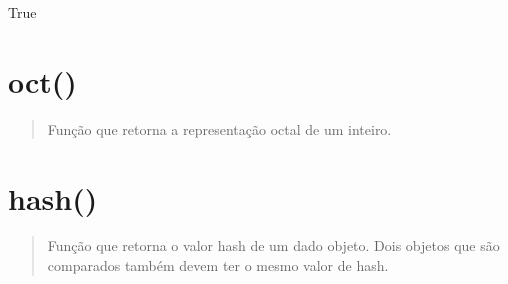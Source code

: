 \documentclass[letterpaper,10pt,brazil]{sphinxmanual}
\begin{document}
True


\section{oct()}
\label{\detokenize{content/built-ins:oct}}\begin{quote}

Função que retorna a representação octal de um inteiro.
\end{quote}

\begin{sphinxVerbatim}[commandchars=\\\{\}]
\end{sphinxVerbatim}

\begin{sphinxVerbatim}[commandchars=\\\{\}]
\end{sphinxVerbatim}

\begin{sphinxVerbatim}[commandchars=\\\{\}]
\end{sphinxVerbatim}

\begin{sphinxVerbatim}[commandchars=\\\{\}]
\end{sphinxVerbatim}


\section{hash()}
\label{\detokenize{content/built-ins:hash}}\begin{quote}

Função que retorna o valor hash de um dado objeto.
Dois objetos que são comparados também devem ter o mesmo valor de hash.
\end{quote}

\begin{sphinxVerbatim}[commandchars=\\\{\}]
  
\end{sphinxVerbatim}

\begin{sphinxVerbatim}[commandchars=\\\{\}]
\end{sphinxVerbatim}
\end{document}
